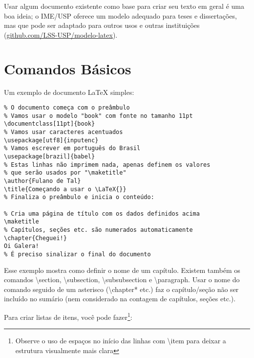 Usar algum documento existente como base para criar seu texto em geral é
uma boa ideia; o IME/USP oferece um modelo adequado para teses e
dissertações, mas que pode ser adaptado para outros usos e outras
instituições (\url{github.com/LSS-USP/modelo-latex}).

\section{Comandos Básicos}

Um exemplo de documento \LaTeX{} simples:

\begin{verbatim}
% O documento começa com o preâmbulo
% Vamos usar o modelo "book" com fonte no tamanho 11pt
\documentclass[11pt]{book}
% Vamos usar caracteres acentuados
\usepackage[utf8]{inputenc}
% Vamos escrever em português do Brasil
\usepackage[brazil]{babel}
% Estas linhas não imprimem nada, apenas definem os valores
% que serão usados por "\maketitle"
\author{Fulano de Tal}
\title{Começando a usar o \LaTeX{}}
% Finaliza o preâmbulo e inicia o conteúdo:

% Cria uma página de título com os dados definidos acima
\maketitle
% Capítulos, seções etc. são numerados automaticamente
\chapter{Cheguei!}
Oi Galera!
% É preciso sinalizar o final do documento

\end{verbatim}

Esse exemplo mostra como definir o nome de um capítulo. Existem também os
comandos \textsf{\textbackslash{}section}, \textsf{\textbackslash{}subsection},
\textsf{\textbackslash{}subsubsection} e \textsf{\textbackslash{}paragraph}.
Usar o nome do comando seguido de um asterisco
(\textsf{\textbackslash{}chapter*} etc.) faz o capítulo/seção não ser incluído
no sumário (nem considerado na contagem de capítulos, seções etc.).

Para criar listas de itens, você pode fazer\footnote{Observe o uso de
espaços no início das linhas com \textbackslash{}item para deixar a estrutura
visualmente mais clara}:

